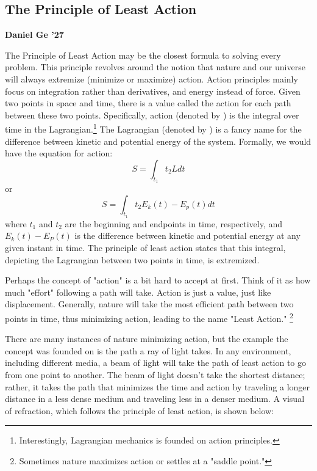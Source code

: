 \documentclass{article}
\begin{document}
\begin{multicols}{2}
\section*{The Principle of Least Action}
\noindent\textbf{Daniel Ge '27}
\medbreak

The Principle of Least Action may be the closest formula to solving every problem. This principle revolves around the notion that nature and our universe will always extremize (minimize or maximize) action. Action principles mainly focus on integration rather than derivatives, and energy instead of force. Given two points in space and time, there is a value called the action for each path between these two points. Specifically, action (denoted by ) is the integral over time in the Lagrangian.\footnote{Interestingly, Lagrangian mechanics is founded on action principles.} The Lagrangian (denoted by ) is a fancy name for the difference between kinetic and potential energy of the system. Formally, we would have the equation for action:
\begin{equation*}
    S = \int_{t_1}{t_2}Ldt
\end{equation*}
or 
\begin{equation*}
    S = \int_{t_1}{t_2}E_k (t) - E_p (t) dt
\end{equation*}
where $t_1$ and $t_2$ are the beginning and endpoints in time, respectively, and $E_k(t) - E_P (t)$ is the difference between kinetic and potential energy at any given instant in time. The principle of least action states that this integral, depicting the Lagrangian between two points in time, is extremized.

Perhaps the concept of "action" is a bit hard to accept at first. Think of it as how much "effort" following a path will take. Action is just a value, just like displacement. Generally, nature will take the most efficient path between two points in time, thus minimizing action, leading to the name "Least Action." \footnote{Sometimes nature maximizes action or settles at a "saddle point."}

There are many instances of nature minimizing action, but the example the concept was founded on is the path a ray of light takes. In any environment, including different media, a beam of light will take the path of least action to go from one point to another. The beam of light doesn't take the shortest distance; rather, it takes the path that minimizes the time and action by traveling a longer distance in a less dense medium and traveling less in a denser medium. A visual of refraction, which follows the principle of least action, is shown below:


\end{multicols}
\end{document}
